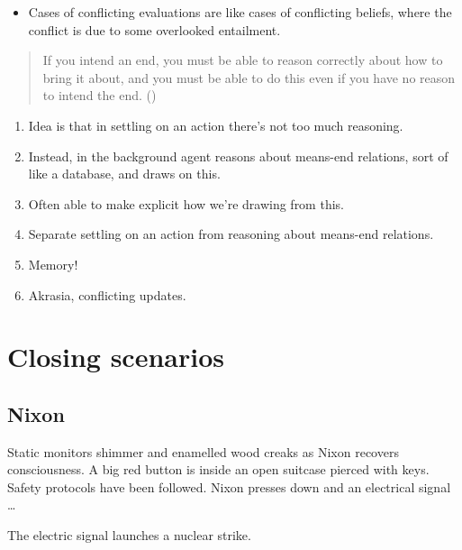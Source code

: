 \documentclass[10pt]{article}
\newcommand{\hozlinedash}[0]{%
  \noindent\hdashrule[0.5ex][c]{\textwidth}{.1pt}{2.5pt}
}
\begin{document}
\begin{itemize}
\item Cases of conflicting evaluations are like cases of conflicting beliefs, where the conflict is due to some overlooked entailment.
\end{itemize}



\begin{quote}
  If you intend an end, you must be able to reason correctly about how to bring it about, and you must be able to do this even if you have no reason to intend the end.\nolinebreak
  \mbox{}\hfill\mbox{(\citeyear[96]{Broome:2002aa})}
\end{quote}

\hozlinedash

\begin{enumerate}
\item Idea is that in settling on an action there's not too much reasoning.
\item Instead, in the background agent reasons about means-end relations, sort of like a database, and draws on this.
\item Often able to make explicit how we're drawing from this.
\item Separate settling on an action from reasoning about means-end relations.
\item Memory!
\item Akrasia, conflicting updates.
\end{enumerate}

\newpage

\section{Closing scenarios}
\label{sec:closing-scenarios}

\subsection{Nixon}
\label{sec:nixon}

\begin{scenario}[Nixon]
  Static monitors shimmer and enamelled wood creaks as Nixon recovers consciousness.
  A big red button is inside an open suitcase pierced with keys.
  Safety protocols have been followed.
  Nixon presses down and an electrical signal \dots
\end{scenario}

The electric signal launches a nuclear strike.
\end{document}
